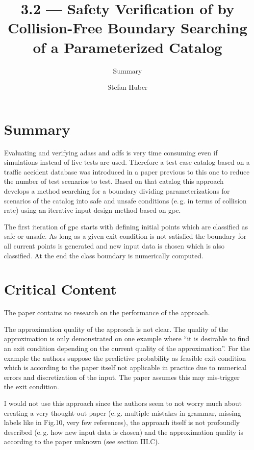 \documentclass[oneside, notitlepage, twocolumn]{scrartcl}
\title{\LARGE 3.2 --- Safety Verification of \glsname{adas} by Collision-Free Boundary Searching of a Parameterized Catalog}
\subtitle{Summary}
\author{Stefan Huber}
\newcommand{\eg}{e.\,g.\xspace}
\begin{document}
\maketitle

\section{Summary}
Evaluating and verifying \glspl{adas} and \glspl{adf} is very time consuming even if simulations instead of live tests are used.
Therefore a test case catalog based on a traffic accident database was introduced in a paper previous to this one to reduce the number of test scenarios to test.
Based on that catalog this approach develops a method searching for a boundary dividing parameterizations for scenarios of the catalog into safe and unsafe conditions (\eg{} in terms of collision rate) using an iterative input design method based on \gls{gpc}.\par
The first iteration of \gls{gpc} starts with defining initial points which are classified as safe or unsafe.
As long as a given exit condition is not satisfied the boundary for all current points is generated and new input data is chosen which is also classified.
At the end the class boundary is numerically computed.

\section{Critical Content}
The paper contains no research on the performance of the approach.\par
The approximation quality of the approach is not clear.
The quality of the approximation is only demonstrated on one example where ``it is desirable to find an exit condition depending on the current quality of the approximation''.
For the example the authors suppose the predictive probability as feasible exit condition which is according to the paper itself not applicable in practice due to numerical errors and discretization of the input.
The paper assumes this may mis-trigger the exit condition.\par
I would not use this approach since the authors seem to not worry much about creating a very thought-out paper (\eg{} multiple mistakes in grammar, missing labels like in Fig.10, very few references), the approach itself is not profoundly described (\eg{} how new input data is chosen) and the approximation quality is according to the paper unknown (see section III.C).
\end{document}

